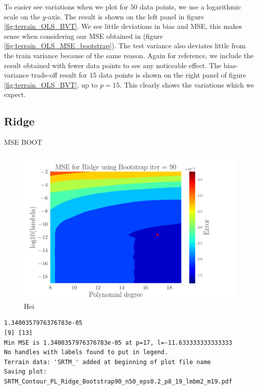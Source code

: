 \documentclass[reprint,english,notitlepage,aps,nobalancelastpage,nofootinbib]{revtex4-1}  %
\begin{document}
To easier see variations when we plot for $50$ data points, we use a logarithmic scale on the $y$-axis. The result is shown on the left panel in figure \ref{fig:terrain_OLS_BVT}. We see little deviations in bias and MSE, this makes sense when considering our MSE obtained in (figure \ref{fig:terrain_OLS_MSE_bootstrap}). The test variance also deviates little from the train variance because of the same reason. Again for reference, we include the result obtained with fewer data points to see any noticeable effect. The bias-variance trade-off result for $15$ data points is shown on the right panel of figure \ref{fig:terrain_OLS_BVT}, up to $p=15$. This clearly shows the variations which we expect.

\subsection*{Ridge}
MSE BOOT
\begin{figure}[H]
	\includegraphics[width=\linewidth]{SRTM_Contour_PL_Ridge_Bootstrap90_n50_eps0.2_p8_19_lmbm2_m19.pdf}
	\caption{Hei}
	\label{fig:terrain_Ridge_MSE_Boot}
\end{figure}
\begin{verbatim}
1.3400357976376783e-05
[9] [13]
Min MSE is 1.3400357976376783e-05 at p=17, l=-11.633333333333333
No handles with labels found to put in legend.
Terrain data: 'SRTM_' added at beginning of plot file name
Saving plot:  SRTM_Contour_PL_Ridge_Bootstrap90_n50_eps0.2_p8_19_lmbm2_m19.pdf
\end{verbatim}
\end{document}
